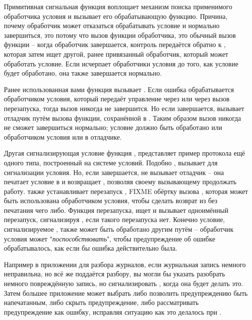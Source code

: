 Примитивная сигнальная функция  воплощает механизм поиска применимого
обработчика условия и вызывает его обрабатывающую функцию. Причина, почему обработчик
может отказаться обрабатывать условие и нормально завершиться, это потому что вызов
функции обработчика, это обычный вызов функции -- когда обработчик завершается, контроль
передаётся обратно к , которая затем ищет другой, ранее привязанный
обработчик, который может обработать условие. Если  исчерпает обработчики
условия до того, как условие будет обработано, она также завершается нормально.

Ранее использованная вами функция  вызывает . Если ошибка
обрабатывается обработчиком условия, который передаёт управление через 
или через вызов перезапуска, тогда вызов  никогда не завершится. Но если
 завершается,  вызывает отладчик путём вызова функции,
сохранённой в . Таким образом вызов  никогда не сможет
завершиться нормально; условие должно быть обработано или обработчиком условия или в
отладчике.

Другая сигнализирующая условие функция , представляет пример протокола ещё
одного типа, построенный на системе условий. Подобно ,  вызывает
 для сигнализации условия. Но, если  завершается,  не
вызывает отладчик -- она печатает условие в  и возвращает ,
позволяя своему вызывающему продолжать работу.  также устанавливает перезапуск
, FIXME обёртку вызова , которая может быть использована
обработчиком условия, чтобы сделать возврат из  без печатания чего
либо. Функция  перезапуска, ищет и вызывает одноимённый перезапуск,
сигнализируя , если такого перезапуска нет. Конечно условие,
сигнализируемое , также может быть обработано другим путём -- обработчик
условия может "\textit{поспособствовать}", чтобы предупреждение об ошибке обрабатывалось,
как если бы ошибка действительно была.

Например в приложении для разбора журналов, если журнальная запись немного неправильна, но
всё же поддаётся разбору, вы могли бы указать  разобрать немного
повреждённую запись, но сигнализировать , когда она будет делать это. Затем
большее приложение может выбрать либо позволить предупреждению быть напечатанным, либо
скрыть предупреждение, либо рассматривать предупреждение как ошибку, исправляя ситуацию
как это делалось при .

